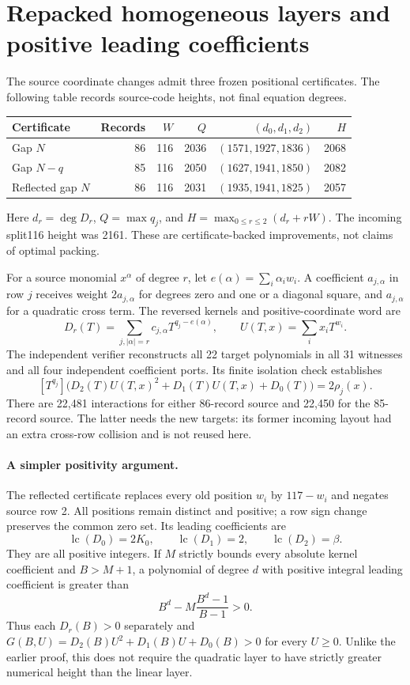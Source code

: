 \section{Repacked homogeneous layers and positive leading coefficients}
\label{sec:carry-repacking}
The source coordinate changes admit three frozen positional certificates.
The following table records source-code heights, not final equation degrees.
\begin{center}
\begin{tabular}{lrrrrr}
\hline
Certificate & Records & $W$ & $Q$ & $(d_0,d_1,d_2)$ & $H$\\
\hline
Gap $N$ &86&116&2036&$(1571,1927,1836)$&2068\\
Gap $N-q$ &85&116&2050&$(1627,1941,1850)$&2082\\
Reflected gap $N$ &86&116&2031&$(1935,1941,1825)$&2057\\
\hline
\end{tabular}
\end{center}
Here $d_r=\deg D_r$, $Q=\max q_j$, and
$H=\max_{0\le r\le2}(d_r+rW)$.  The incoming split116 height was 2161.
These are certificate-backed improvements, not claims of optimal packing.

For a source monomial $x^\alpha$ of degree $r$, let
$e(\alpha)=\sum_i\alpha_iw_i$.  A coefficient $a_{j,\alpha}$ in row $j$
receives weight $2a_{j,\alpha}$ for degrees zero and one or a diagonal
square, and $a_{j,\alpha}$ for a quadratic cross term.  The reversed kernels
and positive-coordinate word are
\[
 D_r(T)=\sum_{j,|\alpha|=r}c_{j,\alpha}T^{q_j-e(\alpha)},\qquad
 U(T,x)=\sum_i x_iT^{w_i}.
\]
The independent verifier reconstructs all 22 target polynomials in all 31
witnesses and all four independent coefficient ports.  Its finite isolation
check establishes
\[
 [T^{q_j}]\bigl(D_2(T)U(T,x)^2+D_1(T)U(T,x)+D_0(T)\bigr)=2\rho_j(x).
\]
There are 22,481 interactions for either 86-record source and 22,450 for the
85-record source.  The latter needs the new targets: its former incoming
layout had an extra cross-row collision and is not reused here.

\paragraph{A simpler positivity argument.}
The reflected certificate replaces every old position $w_i$ by $117-w_i$
and negates source row 2.  All positions remain distinct and positive; a row
sign change preserves the common zero set.  Its leading coefficients are
\[
 \operatorname{lc}(D_0)=2K_0,\qquad
 \operatorname{lc}(D_1)=2,\qquad
 \operatorname{lc}(D_2)=\beta.
\]
They are all positive integers. If $M$ strictly bounds every absolute kernel
coefficient and $B>M+1$, a polynomial of degree $d$ with positive integral
leading coefficient is greater than
\[
 B^d-M\frac{B^d-1}{B-1}>0.
\]
Thus each $D_r(B)>0$ separately and
$G(B,U)=D_2(B)U^2+D_1(B)U+D_0(B)>0$ for every $U\ge0$.
Unlike the earlier proof, this does not require the quadratic layer to have
strictly greater numerical height than the linear layer.

